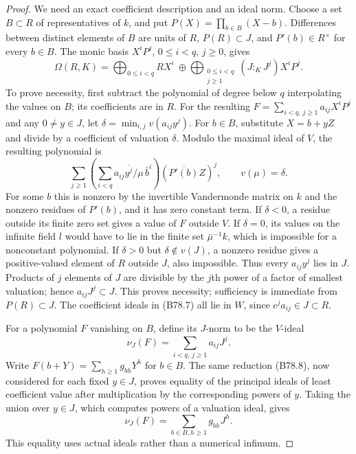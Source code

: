 \begin{proof}
We need an exact coefficient description and an ideal norm.
Choose a set $B\subset R$ of representatives of $k$, and put
$P(X)=\prod_{b\in B}(X-b)$. Differences between distinct elements of
$B$ are units of $R$, $P(R)\subset J$, and $P'(b)\in R^\times$
for every $b\in B$. The monic basis $X^iP^j$, $0\le i<q$, $j\ge0$, gives
\[
 \Omega(R,K)=
 \bigoplus_{0\le i<q}RX^i\ \oplus\!
 \bigoplus_{\substack{0\le i<q\\j\ge1}}
                (J:_KJ^j)X^iP^j.                         \tag{B78.7}
\]
To prove necessity, first subtract the polynomial of degree below $q$
interpolating the values on $B$; its coefficients are in $R$.
For the resulting $F=\sum_{i<q,\,j\ge1}a_{ij}X^iP^j$ and any
$0\ne y\in J$, let $\delta=\min_{i,j}v(a_{ij}y^j)$.
For $b\in B$, substitute $X=b+yZ$ and divide by a coefficient of
valuation $\delta$. Modulo the maximal ideal of $V$, the resulting
polynomial is
\[
             \sum_{j\ge1}\left(\sum_{i<q}
                  \overline{a_{ij}y^j/\mu}\,\bar b^i\right)
                       (\overline{P'(b)}Z)^j,
                      \qquad v(\mu)=\delta.              \tag{B78.8}
\]
For some $b$ this is nonzero by the invertible Vandermonde matrix on
$k$ and the nonzero residues of $P'(b)$, and it has zero constant term. If $\delta<0$, a residue outside
its finite zero set gives a value of $F$ outside $V$. If $\delta=0$,
its values on the infinite field $l$ would have to lie in the finite
set $\bar\mu^{-1}k$, which is impossible for a nonconstant polynomial.
If $\delta>0$ but $\delta\notin v(J)$, a nonzero residue gives a
positive-valued element of $R$ outside $J$, also impossible.
Thus every $a_{ij}y^j$ lies in $J$. Products of $j$ elements of $J$
are divisible by the $j$th power of a factor of smallest valuation;
hence $a_{ij}J^j\subset J$. This proves necessity; sufficiency is
immediate from $P(R)\subset J$. The coefficient ideals in (B78.7)
all lie in $W$, since $c^j a_{ij}\in J\subset R$.

For a polynomial $F$ vanishing on $B$, define its $J$-norm to be the
$V$-ideal
\[
                   \nu_J(F)=\sum_{i<q,\,j\ge1}a_{ij}J^j.
                                                        \tag{B78.9}
\]
Write $F(b+Y)=\sum_{h\ge1}g_{bh}Y^h$ for $b\in B$.
The same reduction (B78.8), now considered for each fixed $y\in J$,
proves equality of the principal ideals of least coefficient value
after multiplication by the corresponding powers of $y$. Taking the
union over $y\in J$, which computes powers of a valuation ideal,
gives
\[
                         \nu_J(F)=\sum_{b\in B,h\ge1}g_{bh}J^h.
                                                        \tag{B78.10}
\]
This equality uses actual ideals rather than a numerical infimum.


\end{proof}
